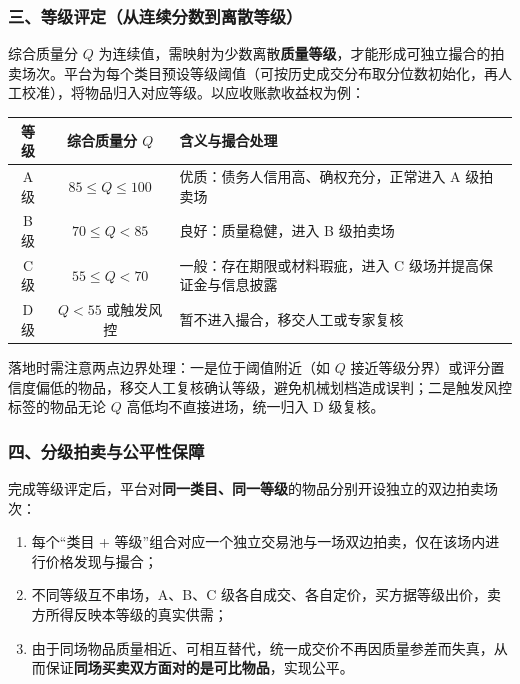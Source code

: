 \documentclass[UTF8,a4paper,12pt]{ctexart}
\begin{document}
\subsubsection*{三、等级评定（从连续分数到离散等级）}

综合质量分 $Q$ 为连续值，需映射为少数离散\textbf{质量等级}，才能形成可独立撮合的拍卖场次。平台为每个类目预设等级阈值（可按历史成交分布取分位数初始化，再人工校准），将物品归入对应等级。以应收账款收益权为例：

\begin{center}
    \begin{tabular}{c c >{\raggedright\arraybackslash}p{8.2cm}}
        \toprule
        等级  & 综合质量分 $Q$          & 含义与撮合处理                         \\
        \midrule
        A 级 & $85 \le Q \le 100$ & 优质：债务人信用高、确权充分，正常进入 A 级拍卖场      \\
        B 级 & $70 \le Q < 85$    & 良好：质量稳健，进入 B 级拍卖场               \\
        C 级 & $55 \le Q < 70$    & 一般：存在期限或材料瑕疵，进入 C 级场并提高保证金与信息披露 \\
        D 级 & $Q < 55$ 或触发风控     & 暂不进入撮合，移交人工或专家复核                \\
        \bottomrule
    \end{tabular}
\end{center}

落地时需注意两点边界处理：一是位于阈值附近（如 $Q$ 接近等级分界）或评分置信度偏低的物品，移交人工复核确认等级，避免机械划档造成误判；二是触发风控标签的物品无论 $Q$ 高低均不直接进场，统一归入 D 级复核。

\subsubsection*{四、分级拍卖与公平性保障}

完成等级评定后，平台对\textbf{同一类目、同一等级}的物品分别开设独立的双边拍卖场次：

\begin{enumerate}
    \item 每个“类目 + 等级”组合对应一个独立交易池与一场双边拍卖，仅在该场内进行价格发现与撮合；
    \item 不同等级互不串场，A、B、C 级各自成交、各自定价，买方据等级出价，卖方所得反映本等级的真实供需；
    \item 由于同场物品质量相近、可相互替代，统一成交价不再因质量参差而失真，从而保证\textbf{同场买卖双方面对的是可比物品}，实现公平。
\end{enumerate}
\end{document}
